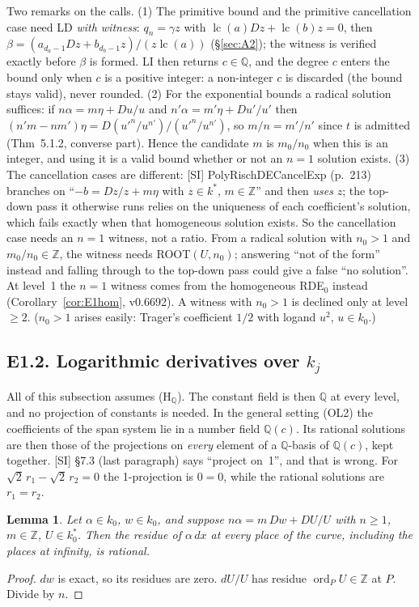 \documentclass[11pt]{article}
\newtheorem{lemma}[theorem]{Lemma}
\theoremstyle{definition}
\theoremstyle{remark}
\newcommand{\Q}{\mathbb{Q}}
\newcommand{\Z}{\mathbb{Z}}
\newcommand{\lc}{\operatorname{lc}}
\begin{document}
Two remarks on the calls. (1) The primitive bound and the primitive cancellation case need
LD \emph{with witness}: $q_n=\gamma z$ with $\lc(a)Dz+\lc(b)z=0$, then
$\beta=(a_{d_a-1}Dz+b_{d_b-1}z)/(z\lc(a))$ (\S\ref{sec:A2}); the witness is verified exactly
before $\beta$ is formed. LI then returns $c\in\Q$, and the degree $c$ enters the bound only
when $c$ is a positive integer: a non-integer $c$ is discarded (the bound stays valid), never
rounded. (2) For the exponential bounds a radical solution suffices: if $n\alpha=m\eta+Du/u$
and $n'\alpha=m'\eta+Du'/u'$ then $(n'm-nm')\eta=D(u'^{n}/u^{n'})/(u'^{n}/u^{n'})$, so
$m/n=m'/n'$ since $t$ is admitted (Thm~5.1.2, converse part). Hence the candidate $m$ is $m_0/n_0$ when this is an
integer, and using it is a valid bound whether or not an $n=1$ solution exists. (3) The
cancellation cases are different: [SI] PolyRischDECancelExp (p.~213) branches on ``$-b=Dz/z+m\eta$
with $z\in k^*$, $m\in\Z$'' and then \emph{uses} $z$; the top-down pass it otherwise runs relies
on the uniqueness of each coefficient's solution, which fails exactly when that homogeneous
solution exists. So the cancellation case needs an $n=1$ witness, not a ratio. From a radical
solution with $n_0>1$ and $m_0/n_0\in\Z$, the witness needs ROOT$(U,n_0)$; answering ``not of
the form'' instead and falling through to the top-down pass could give a false ``no solution''.
At level~1 the $n=1$ witness comes from the homogeneous RDE$_0$ instead
(Corollary~\ref{cor:E1hom}, v0.6692). A witness with $n_0>1$ is declined only at level~$\ge2$. ($n_0>1$ arises easily: Trager's coefficient $1/2$ with
logand $u^2$, $u\in k_0$.)

\subsection*{E1.2. Logarithmic derivatives over $k_j$}

All of this subsection assumes (H$_\Q$). The constant field is then $\Q$ at every level, and
no projection of constants is needed. In the general setting (OL2) the coefficients of the
span system lie in a number field $\Q(c)$. Its rational solutions are then those of the
projections on \emph{every} element of a $\Q$-basis of $\Q(c)$, kept together. [SI] \S7.3
(last paragraph) says ``project on~1'', and that is wrong. For $\sqrt2\,r_1-\sqrt2\,r_2=0$ the
1-projection is $0=0$, while the rational solutions are $r_1=r_2$.

\begin{lemma}\label{lem:E1res}
Let $\alpha\in k_0$, $w\in k_0$, and suppose $n\alpha=m\,Dw+DU/U$ with $n\ge1$, $m\in\Z$,
$U\in k_0^*$. Then the residue of $\alpha\,dx$ at every place of the curve, including the
places at infinity, is rational.
\end{lemma}
\begin{proof}
$d w$ is exact, so its residues are zero. $dU/U$ has residue $\operatorname{ord}_PU\in\Z$ at
$P$. Divide by $n$.
\end{proof}
\end{document}
